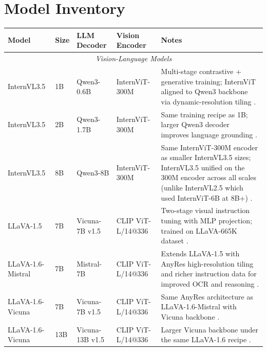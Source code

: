 \documentclass[letterpaper]{article} %
\begin{document}

\begin{table}[!t]
\section{Model Inventory}
\label{app:model_inventory}

\centering
\small
\setlength{\tabcolsep}{4pt}
\label{tab:model_inventory}
\begin{tabularx}{\textwidth}{@{}lp{}llX@{}}
\toprule
\textbf{Model} & \textbf{Size} & \textbf{LLM Decoder} & \textbf{Vision Encoder} & \textbf{Notes} \\
\midrule
\multicolumn{5}{c}{\textit{Vision-Language Models}} \\
\midrule
InternVL3.5        & 1B   & Qwen3-0.6B         & InternViT-300M      & Multi-stage contrastive + generative training; InternViT aligned to Qwen3 backbone via dynamic-resolution tiling \citep{wang2025internvl35}. \\
InternVL3.5        & 2B   & Qwen3-1.7B         & InternViT-300M      & Same training recipe as 1B; larger Qwen3 decoder improves language grounding \citep{wang2025internvl35}. \\
InternVL3.5        & 8B   & Qwen3-8B           & InternViT-300M      & Same InternViT-300M encoder as smaller InternVL3.5 sizes; InternVL3.5 unified on the 300M encoder across all scales (unlike InternVL2.5 which used InternViT-6B at 8B+) \citep{wang2025internvl35}. \\
LLaVA-1.5          & 7B   & Vicuna-7B v1.5     & CLIP ViT-L/14@336   & Two-stage visual instruction tuning with MLP projection; trained on LLaVA-665K dataset \citep{liu2023visual}. \\
LLaVA-1.6-Mistral  & 7B   & Mistral-7B         & CLIP ViT-L/14@336   & Extends LLaVA-1.5 with AnyRes high-resolution tiling and richer instruction data for improved OCR and reasoning \citep{liu2024llavanext}. \\
LLaVA-1.6-Vicuna   & 7B   & Vicuna-7B v1.5     & CLIP ViT-L/14@336   & Same AnyRes architecture as LLaVA-1.6-Mistral with Vicuna backbone \citep{liu2024llavanext}. \\
LLaVA-1.6-Vicuna   & 13B  & Vicuna-13B v1.5    & CLIP ViT-L/14@336   & Larger Vicuna backbone under the same LLaVA-1.6 recipe \citep{liu2024llavanext}. \\

\end{tabularx}
\end{table}
\end{document}
